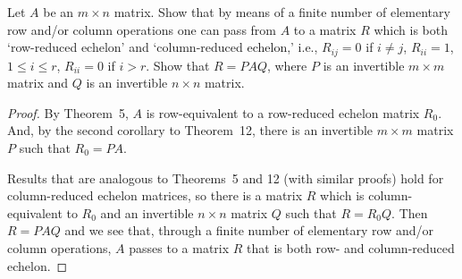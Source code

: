  Let $A$ be an $m\times n$ matrix. Show that by means of
a finite number of elementary row and/or column operations one can
pass from $A$ to a matrix $R$ which is both `row-reduced echelon' and
`column-reduced echelon,' i.e., $R_{ij} = 0$ if $i\neq j$,
$R_{ii} = 1$, $1\leq i\leq r$, $R_{ii} = 0$ if $i > r$. Show that
$R = PAQ$, where $P$ is an invertible $m\times m$ matrix and $Q$ is an
invertible $n\times n$ matrix.
\begin{proof}
  By Theorem~5, $A$ is row-equivalent to a row-reduced echelon matrix
  $R_0$. And, by the second corollary to Theorem~12, there is an
  invertible $m\times m$ matrix $P$ such that $R_0 = PA$.

  Results that are analogous to Theorems~5 and 12 (with similar
  proofs) hold for column-reduced echelon matrices, so there is a
  matrix $R$ which is column-equivalent to $R_0$ and an invertible
  $n\times n$ matrix $Q$ such that $R = R_0Q$. Then $R = PAQ$ and we
  see that, through a finite number of elementary row and/or column
  operations, $A$ passes to a matrix $R$ that is both row- and
  column-reduced echelon.
\end{proof}
